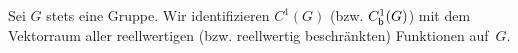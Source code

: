 \begin{thSetup} \label{setup}
    Sei $G$ stets eine Gruppe.
    Wir identifizieren $C^1(G)$ (bzw. $C_{\mathsf{b}}^1(G)$) mit dem Vektorraum aller
    reellwertigen (bzw. reellwertig beschränkten) Funktionen auf~$G$.
\end{thSetup}

